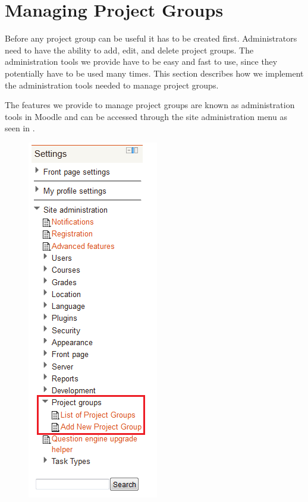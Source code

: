 \section{Managing Project Groups} %
\label{sec:manProjGrpImpl}
Before any project group can be useful it has to be created first.
Administrators need to have the ability to add, edit, and delete project groups.
The administration tools we provide have to be easy and fast to use, since they potentially have to be used many times.
This section describes how we implement the administration tools needed to manage project groups.

The features we provide to manage project groups are known as administration tools in Moodle and can be accessed through the site administration menu as seen in .

\begin{figure}[htb]
	\centering
		\includegraphics[scale=0.75]{images/admin-navigation.png}
	\label{fig:navigation}
\end{figure}


